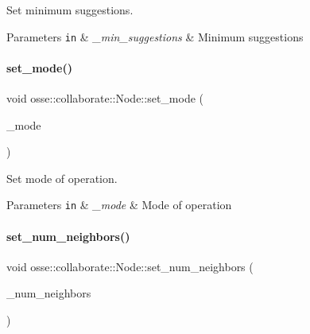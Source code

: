 Set minimum suggestions. 


\begin{DoxyParams}[1]{Parameters}
\mbox{\tt in}  & {\em \+\_\+min\+\_\+suggestions} & Minimum suggestions \\
\hline
\end{DoxyParams}
\mbox{\label{classosse_1_1collaborate_1_1_node_a3d477f1fa6f8866f4b35618efb5802d2}} 
\paragraph{\texorpdfstring{set\+\_\+mode()}{set\_mode()}}
{\footnotesize\ttfamily void osse\+::collaborate\+::\+Node\+::set\+\_\+mode (\begin{DoxyParamCaption}\item[{const \hyperlink{classosse_1_1collaborate_1_1_node_a6f8b0270e42a0c2059d7b554acfbd3db}{k\+Mode} \&}]{\+\_\+mode }\end{DoxyParamCaption})}



Set mode of operation. 


\begin{DoxyParams}[1]{Parameters}
\mbox{\tt in}  & {\em \+\_\+mode} & Mode of operation \\
\hline
\end{DoxyParams}
\mbox{\label{classosse_1_1collaborate_1_1_node_a40068aa3df9446eb12db7db47c2ae1e3}} 
\paragraph{\texorpdfstring{set\+\_\+num\+\_\+neighbors()}{set\_num\_neighbors()}}
{\footnotesize\ttfamily void osse\+::collaborate\+::\+Node\+::set\+\_\+num\+\_\+neighbors (\begin{DoxyParamCaption}\item[{const uint16\+\_\+t \&}]{\+\_\+num\+\_\+neighbors }\end{DoxyParamCaption})\hspace{0.3cm}{\ttfamily [inline]}}



